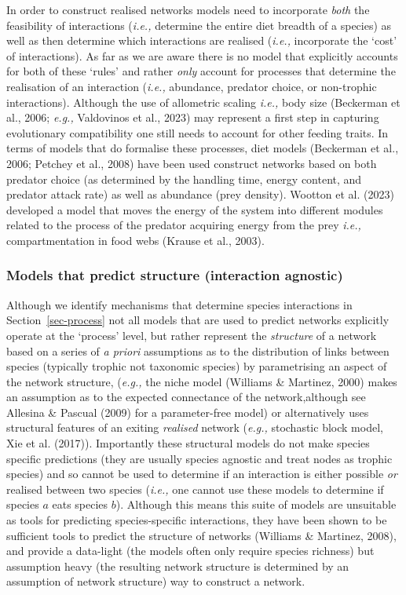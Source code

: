 \documentclass[
]{article}
\begin{document}
In order to construct realised networks models need to incorporate
\emph{both} the feasibility of interactions (\emph{i.e.,} determine the
entire diet breadth of a species) as well as then determine which
interactions are realised (\emph{i.e.,} incorporate the `cost' of
interactions). As far as we are aware there is no model that explicitly
accounts for both of these `rules' and rather \emph{only} account for
processes that determine the realisation of an interaction (\emph{i.e.,}
abundance, predator choice, or non-trophic interactions). Although the
use of allometric scaling \emph{i.e.,} body size (Beckerman et al.,
2006; \emph{e.g.,} Valdovinos et al., 2023) may represent a first step
in capturing evolutionary compatibility one still needs to account for
other feeding traits. In terms of models that do formalise these
processes, diet models (Beckerman et al., 2006; Petchey et al., 2008)
have been used construct networks based on both predator choice (as
determined by the handling time, energy content, and predator attack
rate) as well as abundance (prey density). Wootton et al. (2023)
developed a model that moves the energy of the system into different
modules related to the process of the predator acquiring energy from the
prey \emph{i.e.,} compartmentation in food webs (Krause et al., 2003).

\subsubsection{Models that predict structure (interaction
agnostic)}\label{models-that-predict-structure-interaction-agnostic}

Although we identify mechanisms that determine species interactions in
Section~\ref{sec-process} not all models that are used to predict
networks explicitly operate at the `process' level, but rather represent
the \emph{structure} of a network based on a series of \emph{a priori}
assumptions as to the distribution of links between species (typically
trophic not taxonomic species) by parametrising an aspect of the network
structure, (\emph{e.g.,} the niche model (Williams \& Martinez, 2000)
makes an assumption as to the expected connectance of the
network,although see Allesina \& Pascual (2009) for a parameter-free
model) or alternatively uses structural features of an exiting
\emph{realised} network (\emph{e.g.,} stochastic block model, Xie et al.
(2017)). Importantly these structural models do not make species
specific predictions (they are usually species agnostic and treat nodes
as trophic species) and so cannot be used to determine if an interaction
is either possible \emph{or} realised between two species (\emph{i.e.,}
one cannot use these models to determine if species \(a\) eats species
\(b\)). Although this means this suite of models are unsuitable as tools
for predicting species-specific interactions, they have been shown to be
sufficient tools to predict the structure of networks (Williams \&
Martinez, 2008), and provide a data-light (the models often only require
species richness) but assumption heavy (the resulting network structure
is determined by an assumption of network structure) way to construct a
network.
\end{document}

